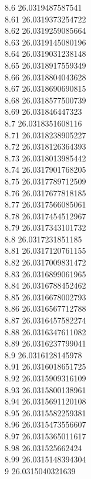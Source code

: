 {8.6	26.0319487587541\\
8.61	26.0319373254722\\
8.62	26.0319259085664\\
8.63	26.0319145080196\\
8.64	26.0319031238148\\
8.65	26.0318917559349\\
8.66	26.0318804043628\\
8.67	26.0318690690815\\
8.68	26.0318577500739\\
8.69	26.031846447323\\
8.7	26.0318351608116\\
8.71	26.0318238905227\\
8.72	26.0318126364393\\
8.73	26.0318013985442\\
8.74	26.0317901768205\\
8.75	26.0317789712509\\
8.76	26.0317677818185\\
8.77	26.0317566085061\\
8.78	26.0317454512967\\
8.79	26.0317343101732\\
8.8	26.0317231851185\\
8.81	26.0317120761155\\
8.82	26.0317009831472\\
8.83	26.0316899061965\\
8.84	26.0316788452462\\
8.85	26.0316678002793\\
8.86	26.0316567712788\\
8.87	26.0316457582274\\
8.88	26.0316347611082\\
8.89	26.0316237799041\\
8.9	26.0316128145978\\
8.91	26.0316018651725\\
8.92	26.0315909316109\\
8.93	26.0315800138961\\
8.94	26.0315691120108\\
8.95	26.0315582259381\\
8.96	26.0315473556607\\
8.97	26.0315365011617\\
8.98	26.031525662424\\
8.99	26.0315148394304\\
9	26.0315040321639\\
}

